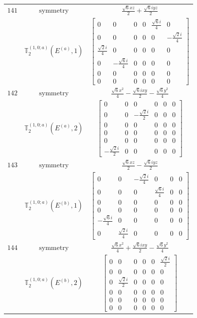 \documentclass[fleqn,8pt,landscape]{jsarticle}
\begin{document}
\begin{longtable}{ccc}
$ 141 $ & $ \text{symmetry} $ & $ \frac{\sqrt{6} x z}{2} + \frac{\sqrt{6} i y z}{2} $ \\
$  $ & $ \mathbb{T}_{2}^{(1,0;a)}(E^{(a)},1) $ & $ \begin{bmatrix} 0 & 0 & 0 & 0 & \frac{\sqrt{6} i}{4} & 0 \\ 0 & 0 & 0 & 0 & 0 & - \frac{\sqrt{2} i}{4} \\ \frac{\sqrt{2} i}{4} & 0 & 0 & 0 & 0 & 0 \\ 0 & - \frac{\sqrt{6} i}{4} & 0 & 0 & 0 & 0 \\ 0 & 0 & 0 & 0 & 0 & 0 \\ 0 & 0 & 0 & 0 & 0 & 0 \end{bmatrix} $ \\ \hline
$ 142 $ & $ \text{symmetry} $ & $ \frac{\sqrt{6} x^{2}}{4} - \frac{\sqrt{6} i x y}{2} - \frac{\sqrt{6} y^{2}}{4} $ \\
$  $ & $ \mathbb{T}_{2}^{(1,0;a)}(E^{(a)},2) $ & $ \begin{bmatrix} 0 & 0 & 0 & 0 & 0 & 0 \\ 0 & 0 & - \frac{\sqrt{2} i}{2} & 0 & 0 & 0 \\ 0 & 0 & 0 & 0 & 0 & 0 \\ 0 & 0 & 0 & 0 & 0 & 0 \\ 0 & 0 & 0 & 0 & 0 & 0 \\ - \frac{\sqrt{2} i}{2} & 0 & 0 & 0 & 0 & 0 \end{bmatrix} $ \\ \hline
$ 143 $ & $ \text{symmetry} $ & $ \frac{\sqrt{6} x z}{2} - \frac{\sqrt{6} i y z}{2} $ \\
$  $ & $ \mathbb{T}_{2}^{(1,0;a)}(E^{(b)},1) $ & $ \begin{bmatrix} 0 & 0 & - \frac{\sqrt{2} i}{4} & 0 & 0 & 0 \\ 0 & 0 & 0 & \frac{\sqrt{6} i}{4} & 0 & 0 \\ 0 & 0 & 0 & 0 & 0 & 0 \\ 0 & 0 & 0 & 0 & 0 & 0 \\ - \frac{\sqrt{6} i}{4} & 0 & 0 & 0 & 0 & 0 \\ 0 & \frac{\sqrt{2} i}{4} & 0 & 0 & 0 & 0 \end{bmatrix} $ \\ \hline
$ 144 $ & $ \text{symmetry} $ & $ \frac{\sqrt{6} x^{2}}{4} + \frac{\sqrt{6} i x y}{2} - \frac{\sqrt{6} y^{2}}{4} $ \\
$  $ & $ \mathbb{T}_{2}^{(1,0;a)}(E^{(b)},2) $ & $ \begin{bmatrix} 0 & 0 & 0 & 0 & 0 & \frac{\sqrt{2} i}{2} \\ 0 & 0 & 0 & 0 & 0 & 0 \\ 0 & \frac{\sqrt{2} i}{2} & 0 & 0 & 0 & 0 \\ 0 & 0 & 0 & 0 & 0 & 0 \\ 0 & 0 & 0 & 0 & 0 & 0 \\ 0 & 0 & 0 & 0 & 0 & 0 \end{bmatrix} $ \\ \hline

\end{longtable}
\end{document}

